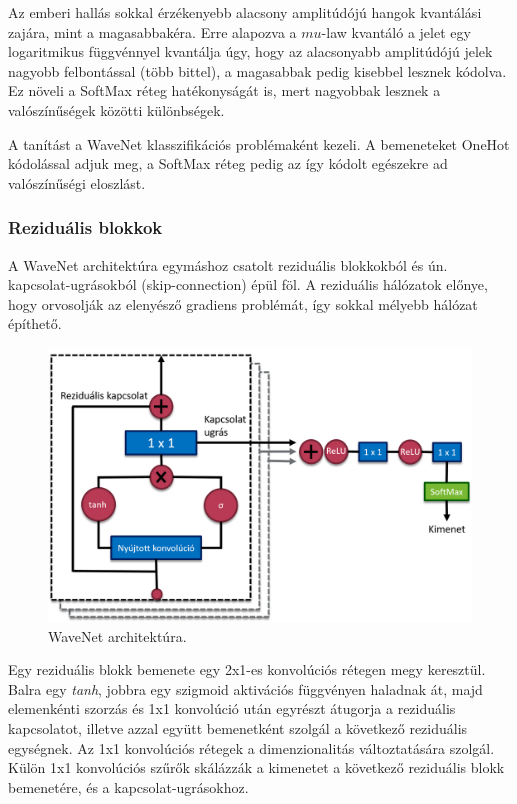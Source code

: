 Az emberi hallás sokkal érzékenyebb alacsony amplitúdójú hangok kvantálási zajára, mint a magasabbakéra. Erre alapozva a $mu$-law kvantáló a jelet egy logaritmikus függvénnyel kvantálja úgy, hogy az alacsonyabb amplitúdójú jelek nagyobb felbontással (több bittel), a magasabbak pedig kisebbel lesznek kódolva. Ez növeli a SoftMax réteg hatékonyságát is, mert nagyobbak lesznek a valószínűségek közötti különbségek.

A tanítást a WaveNet klasszifikációs problémaként kezeli. A bemeneteket OneHot kódolással adjuk meg, a SoftMax réteg pedig az így kódolt egészekre ad valószínűségi eloszlást.

\subsubsection{Reziduális blokkok}

A WaveNet architektúra egymáshoz csatolt reziduális blokkokból és ún. kapcsolat-ugrásokból (skip-connection) épül föl. A reziduális hálózatok előnye, hogy orvosolják az elenyésző gradiens problémát, így sokkal mélyebb hálózat építhető.

\begin{figure}[!ht]
	\centering
	\includegraphics[width=150mm, keepaspectratio]{figures/wavenet_arch.png}
	\caption{WaveNet architektúra.}
	\label{fig:wavenet_arch}
\end{figure}

Egy reziduális blokk bemenete egy 2x1-es konvolúciós rétegen megy keresztül. Balra egy \emph{tanh}, jobbra egy szigmoid aktivációs függvényen haladnak át, majd elemenkénti szorzás és 1x1 konvolúció után egyrészt átugorja a reziduális kapcsolatot, illetve azzal együtt bemenetként szolgál a következő reziduális egységnek. Az 1x1 konvolúciós rétegek a dimenzionalitás változtatására szolgál. Külön 1x1 konvolúciós szűrők skálázzák a kimenetet a következő reziduális blokk bemenetére, és a kapcsolat-ugrásokhoz.

